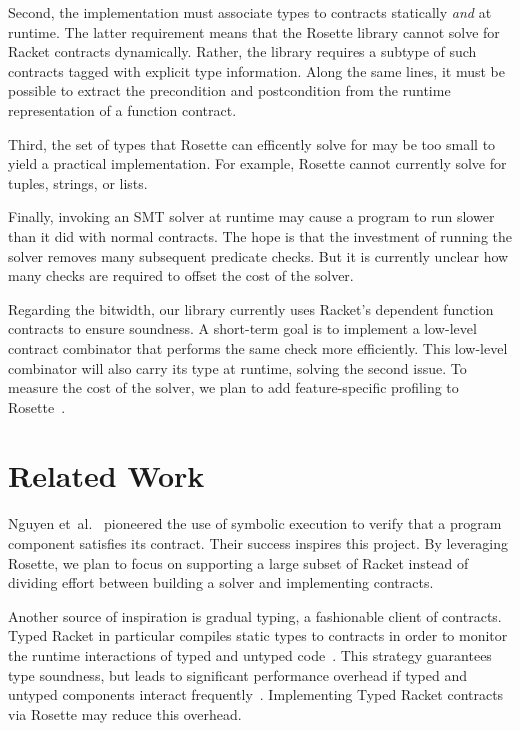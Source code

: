 \documentclass[preprint,9pt]{sigplanconf}
\begin{document}
Second, the implementation must associate types to contracts statically \emph{and} at runtime.
The latter requirement means that the Rosette library cannot solve for Racket contracts dynamically.
Rather, the library requires a subtype of such contracts tagged with explicit type information. %
Along the same lines, it must be possible to extract the precondition and postcondition from the runtime representation of a function contract.

Third, the set of types that Rosette can efficently solve for may be too small to yield a practical implementation.
For example, Rosette cannot currently solve for tuples, strings, or lists.

Finally, invoking an SMT solver at runtime may cause a program to run slower than it did with normal contracts.
The hope is that the investment of running the solver removes many subsequent predicate checks.
But it is currently unclear how many checks are required to offset the cost of the solver.

Regarding the bitwidth, our library currently uses Racket's dependent function contracts to ensure soundness.
A short-term goal is to implement a low-level contract combinator that performs the same check more efficiently.
This low-level combinator will also carry its type at runtime, solving the second issue.
To measure the cost of the solver, we plan to add feature-specific profiling to Rosette~\cite{saf-cc-2015}.


\section{Related Work}

Nguyen et~al.~\cite{ntv-icfp-2014} pioneered the use of symbolic execution to verify that a program component satisfies its contract.
Their success inspires this project.
By leveraging Rosette, we plan to focus on supporting a large subset of Racket instead of dividing effort between building a solver and implementing contracts.

Another source of inspiration is gradual typing, a fashionable client of contracts.
Typed Racket in particular compiles static types to contracts in order to monitor the runtime interactions of typed and untyped code~\cite{tf-popl-2008}.
This strategy guarantees type soundness, but leads to significant performance overhead if typed and untyped components interact frequently~\cite{tfgnfv-popl-2016}.
Implementing Typed Racket contracts via Rosette may reduce this overhead.
\end{document}
